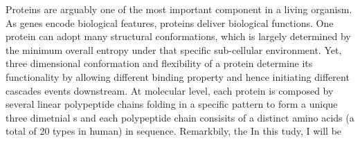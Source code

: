 Proteins are arguably one of the most important component in a living organism. As genes encode biological features, proteins deliver biological functions. One protein can adopt many structural conformations, which is largely determined by the minimum overall entropy under that specific sub-cellular environment. Yet, three dimensional conformation and flexibility of a protein determine its functionality by allowing different binding property and hence initiating different cascades events downstream. At molecular level, each protein is composed by several linear polypeptide chains folding in a specific pattern to form a unique three dimetnial s and each polypeptide chain consisits of a distinct amino acids (a total of 20 types in human) in sequence. Remarkbily, the  In this tudy, I will be 